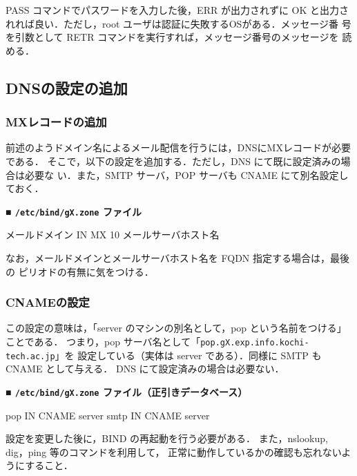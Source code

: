 PASS コマンドでパスワードを入力した後，ERR が出力されずに OK と出力さ
れれば良い．ただし，root ユーザは認証に失敗するOSがある．メッセージ番
号を引数として RETR コマンドを実行すれば，メッセージ番号のメッセージを
読める．

\subsection{DNSの設定の追加}
\subsubsection{MXレコードの追加}
前述のようドメイン名によるメール配信を行うには，DNSにMXレコードが必要である．
そこで，以下の設定を追加する．ただし，DNS にて既に設定済みの場合は必要な
い．また，SMTP サーバ，POP サーバも CNAME にて別名設定しておく．

\noindent
{\bf ■ \texttt{/etc/bind/gX.zone} ファイル}
\begin{cli}
メールドメイン           IN      MX 10   メールサーバホスト名
\end{cli}

なお，メールドメインとメールサーバホスト名を FQDN 指定する場合は，最後の
ピリオドの有無に気をつける．

\subsubsection{CNAMEの設定}
この設定の意味は，「server のマシンの別名として，pop という名前をつける」ことである．
つまり，pop サーバ名として「\texttt{pop.gX.exp.info.kochi-tech.ac.jp}」を
設定している（実体は server である）．同様に SMTP も CNAME として与える．
DNS にて設定済みの場合は必要ない．

\noindent
{\bf ■ \texttt{/etc/bind/gX.zone} ファイル（正引きデータベース）}
\begin{cli}
pop       IN      CNAME   server
smtp       IN      CNAME   server
\end{cli}

設定を変更した後に，BIND の再起動を行う必要がある．
また，nslookup, dig，ping 等のコマンドを利用して，
正常に動作しているかの確認も忘れないようにすること．

